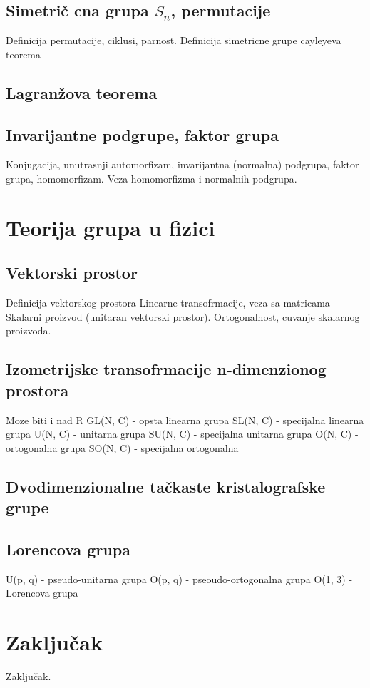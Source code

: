\documentclass[times, utf8, diplomski]{fer}
\begin{document}
\section{Simetri\v{c} cna grupa $S_n$, permutacije}
Definicija permutacije, ciklusi, parnost.
Definicija simetricne grupe
cayleyeva teorema
\section{Lagran\v{z}ova teorema}
\section{Invarijantne podgrupe, faktor grupa}
Konjugacija, unutrasnji automorfizam, invarijantna (normalna) podgrupa, faktor grupa, homomorfizam.
Veza homomorfizma i normalnih podgrupa.

\chapter{Teorija grupa u fizici}
\section{Vektorski prostor}
Definicija vektorskog prostora
Linearne transofrmacije, veza sa matricama
Skalarni proizvod (unitaran vektorski prostor).
Ortogonalnost, cuvanje skalarnog proizvoda.
\section{Izometrijske transofrmacije n-dimenzionog prostora}
Moze biti i nad R
GL(N, C) - opsta linearna grupa
SL(N, C) - specijalna linearna grupa
U(N, C) - unitarna grupa
SU(N, C) - specijalna unitarna grupa
O(N, C) - ortogonalna grupa
SO(N, C) - specijalna ortogonalna
\section{Dvodimenzionalne ta\v{c}kaste kristalografske grupe}
\section{Lorencova grupa}
U(p, q) - pseudo-unitarna grupa
O(p, q) - pseoudo-ortogonalna grupa
O(1, 3) - Lorencova grupa

\chapter{Zaključak}
Zaključak.



\end{document}
